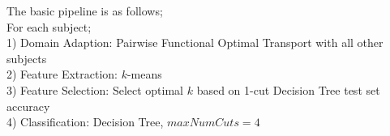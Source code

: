 \documentclass[]{article}
\begin{document}
The basic pipeline is as follows;\\

\noindent
For each subject;\\
1) Domain Adaption: Pairwise Functional Optimal Transport with all other subjects\\
2) Feature Extraction: $k$-means\\
3) Feature Selection: Select optimal $k$ based on 1-cut Decision Tree test set accuracy\\
4) Classification: Decision Tree, $maxNumCuts = 4$\\
\end{document}
